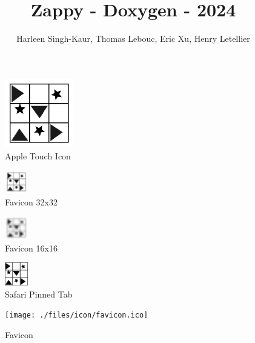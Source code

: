 \documentclass{article}
\title{Zappy - Doxygen - 2024}
\author{Harleen Singh-Kaur, Thomas Lebouc, Eric Xu, Henry Letellier}
\date{} %
\begin{document}
\maketitle

\begin{figure}[h]
    \centering
    \includegraphics[width=3cm]{./files/icon/apple-touch-icon.png}
    \caption*{Apple Touch Icon}
\end{figure}

\begin{figure}[h]
    \centering
    \includegraphics[width=1cm]{./files/icon/favicon-32x32.png}
    \caption*{Favicon 32x32}
\end{figure}

\begin{figure}[h]
    \centering
    \includegraphics[width=1cm]{./files/icon/favicon-16x16.png}
    \caption*{Favicon 16x16}
\end{figure}

\begin{figure}[h]
    \centering
    \includegraphics[width=1cm]{./files/icon/safari-pinned-tab.svg}
    \caption*{Safari Pinned Tab}
\end{figure}

\begin{figure}[h]
    \centering
    \texttt{[image: ./files/icon/favicon.ico]}
    \caption*{Favicon}
\end{figure}
\end{document}
